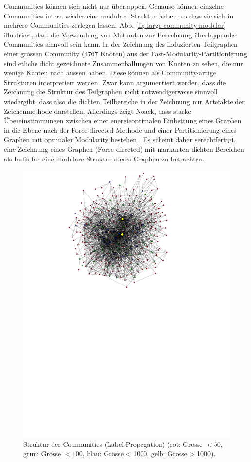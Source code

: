 Communities k\"onnen sich nicht nur \"uberlappen. Genauso k\"onnen
einzelne Communities intern wieder eine modulare Struktur haben, so
dass sie sich in mehrere Communities zerlegen lassen.
Abb. \ref{fig:large-community-modular} illustriert, dass die
Verwendung von Methoden zur Berechnung \"uberlappender Communities
sinnvoll sein kann. In der Zeichnung des induzierten Teilgraphen einer
grossen Community (4767 Knoten) aus der
Fast-Modularity-Partitionierung sind etliche dicht gezeichnete
Zusammenballungen von Knoten zu sehen, die nur wenige Kanten nach
aussen haben. Diese k\"onnen als Community-artige Strukturen
interpretiert werden. Zwar kann argumentiert werden, dass die
Zeichnung die Struktur des Teilgraphen nicht notwendigerweise sinnvoll
wiedergibt, dass also die dichten Teilbereiche in der Zeichnung nur
Artefakte der Zeichenmethode darstellen. Allerdings zeigt Noack, dass
starke \"Ubereinstimmungen zwischen einer energieoptimalen Einbettung
eines Graphen in die Ebene nach der Force-directed-Methode und einer
Partitionierung eines Graphen mit optimaler Modularity bestehen
\cite{Noack2009}. Es scheint daher gerechtfertigt, eine Zeichnung
eines Graphen (Force-directed) mit markanten dichten Bereichen als
Indiz f\"ur eine modulare Struktur dieses Graphen zu betrachten.
\begin{figure}[h]
  \centering
  \includegraphics[scale=1.5]{images/label-prop-metagraph-20-narrow-cut.pdf}
  \caption{Struktur der Communities (Label-Propagation) (rot: Gr\"osse
    $<50$, gr\"un: Gr\"osse $<100$, blau: Gr\"osse < 1000, gelb:
    Gr\"osse > 1000).}
  \label{fig:metagraph-com-label}
\end{figure}


